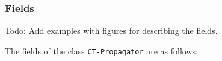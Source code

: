\documentclass[a4paper,11pt]{article}
\newcommand{\Todo}[1]{{\color{blue}Todo: #1}}
\newcommand{\SparseBitSet}{\texttt{SparseBitSet}}
\begin{document}



\subsubsection{Fields}

\Todo{Add examples with figures for describing the fields.}

The fields of the class \texttt{CT-Propagator} are as follows:
\end{document}
